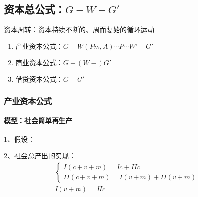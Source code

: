 \documentclass[12pt]{book}
\begin{document}
\subsection{资本总公式：$G-W-G'$}

\par 资本周转：资本持续不断的、周而复始的循环运动
\begin{enumerate}[(1)]
    \item 产业资本公式：$G-W(Pm,A)\cdots P\cdots W′-G′$
    \item 商业资本公式：$G-(W-)G'$
    \item 借贷资本公式：$G-G'$
\end{enumerate}


\subsubsection{产业资本公式}



\paragraph{模型：社会简单再生产}


1、假设：


2、社会总产出的实现：
\begin{gather*}
    \begin{cases}
        I(c+v+m)=I c+II c \\
        II (c+v+m)=I(v+m)+II(v+m)
    \end{cases}\\
    I(v+m)=IIc
\end{gather*}
\end{document}
